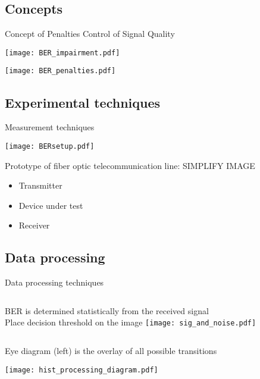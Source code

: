   
  \subsection{Concepts} %
  \label{sub:concepts}
  \begin{frame}{Concept of Penalties}
               {Control of Signal Quality}
    \begin{center}
     \texttt{[image: BER\_impairment.pdf]}
    \end{center}
    \begin{center}
     \texttt{[image: BER\_penalties.pdf]}
    \end{center}
  \end{frame}





  \subsection{Experimental techniques} %
  \label{sub:experimental_techniques}
  


  \begin{frame}{Measurement techniques}
   \begin{center}
    \texttt{[image: BERsetup.pdf]}
   \end{center}
    Prototype of fiber optic telecommunication line: \alert{SIMPLIFY IMAGE}
    \begin{itemize}
      \item Transmitter
      \item Device under test
      \item Receiver
    \end{itemize}
  \end{frame}

  \subsection{Data processing} %
  \label{sub:data_processing}
  
  \begin{frame}{Data processing techniques}
    \begin{columns}
        BER is determined statistically from the received signal\\
        \alert{Place decision threshold on the image}
        \texttt{[image: sig\_and\_noise.pdf]}
    \end{columns}
    Eye diagram (left) is the overlay of all possible transitions
    \begin{center}
      \texttt{[image: hist\_processing\_diagram.pdf]}
    \end{center}
  \end{frame}



